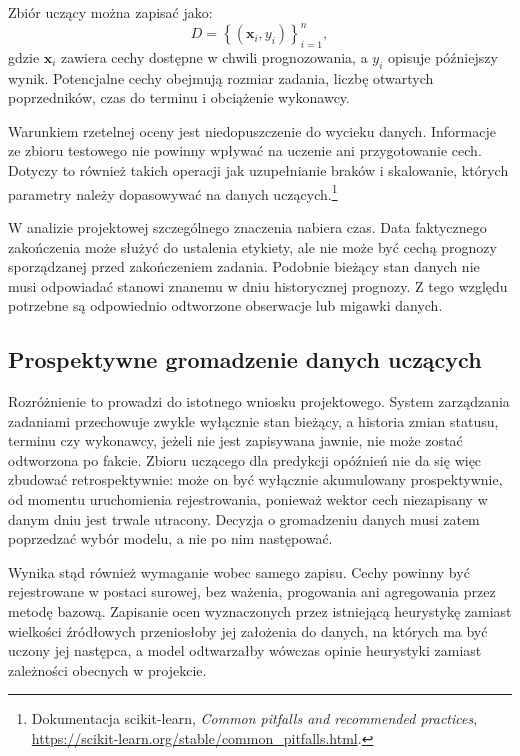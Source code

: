 Zbiór uczący można zapisać jako:
\begin{equation}
    D = \left\{(\mathbf{x}_i, y_i)\right\}_{i=1}^{n},
    \label{eq:zbior-uczacy}
\end{equation}
gdzie \(\mathbf{x}_i\) zawiera cechy dostępne w chwili prognozowania, a \(y_i\) opisuje późniejszy wynik. Potencjalne cechy obejmują rozmiar zadania, liczbę otwartych poprzedników, czas do terminu i obciążenie wykonawcy.

Warunkiem rzetelnej oceny jest niedopuszczenie do wycieku danych. Informacje ze zbioru testowego nie powinny wpływać na uczenie ani przygotowanie cech. Dotyczy to również takich operacji jak uzupełnianie braków i skalowanie, których parametry należy dopasowywać na danych uczących.\footnote{Dokumentacja scikit-learn, \textit{Common pitfalls and recommended practices}, \url{https://scikit-learn.org/stable/common_pitfalls.html}.}

W analizie projektowej szczególnego znaczenia nabiera czas. Data faktycznego zakończenia może służyć do ustalenia etykiety, ale nie może być cechą prognozy sporządzanej przed zakończeniem zadania. Podobnie bieżący stan danych nie musi odpowiadać stanowi znanemu w dniu historycznej prognozy. Z tego względu potrzebne są odpowiednio odtworzone obserwacje lub migawki danych.

\subsection*{Prospektywne gromadzenie danych uczących}

Rozróżnienie to prowadzi do istotnego wniosku projektowego. System zarządzania zadaniami przechowuje zwykle wyłącznie stan bieżący, a historia zmian statusu, terminu czy wykonawcy, jeżeli nie jest zapisywana jawnie, nie może zostać odtworzona po fakcie. Zbioru uczącego dla predykcji opóźnień nie da się więc zbudować retrospektywnie: może on być wyłącznie akumulowany prospektywnie, od momentu uruchomienia rejestrowania, ponieważ wektor cech niezapisany w danym dniu jest trwale utracony. Decyzja o gromadzeniu danych musi zatem poprzedzać wybór modelu, a nie po nim następować.

Wynika stąd również wymaganie wobec samego zapisu. Cechy powinny być rejestrowane w postaci surowej, bez ważenia, progowania ani agregowania przez metodę bazową. Zapisanie ocen wyznaczonych przez istniejącą heurystykę zamiast wielkości źródłowych przeniosłoby jej założenia do danych, na których ma być uczony jej następca, a model odtwarzałby wówczas opinie heurystyki zamiast zależności obecnych w projekcie.

